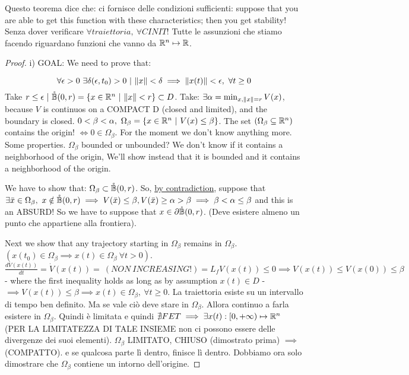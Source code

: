 Questo teorema dice che: ci fornisce delle condizioni sufficienti: suppose that you are able to get this function with these characteristics; then you get stability! Senza dover verificare $\forall traiettoria,\ \forall CINIT$! Tutte le assunzioni che stiamo facendo riguardano funzioni che vanno da $\mathbb{R}^n \mapsto \mathbb{R}$.

\begin{proof}{i)} \newline
GOAL: We need to prove that:

\[
	\forall \epsilon > 0\ \exists \delta(\epsilon,t_0) > 0\ |\ \lVert x\rVert < \delta \implies \lVert x(t)\rVert < \epsilon,\ \forall t \geq 0
\]
	Take $r \leq \epsilon\ |\ \oball(0,r) = \{x \in \R^n\ |\ \norma{x} < r\} \subset D$. Take:
$\exists \alpha = \min_{x,\lVert x\rVert=r}{V(x)}$, because $V$ is continuos on a COMPACT D (closed and limited), and the boundary is closed. $0 < \beta < \alpha,\ \Omega_\beta=\{x \in \R^n\ |\ V(x) \leq \beta\}$. The set $(\Omega_\beta \subseteq \mathbb{R}^n)$ contains the origin! $\iff 0 \in \Omega_\beta$.
For the moment we don't know anything more. Some properties. $\Omega_\beta$ bounded or unbounded? We don't know if it contains a neighborhood of the origin, We'll show instead that it is bounded and it contains a neighborhood of the origin.

We have to show that: $\Omega_\beta \subset \mathring{\mathbb{B}}(0,r)$. So, \underline{by contradiction}, suppose that $\exists \bar{x} \in \Omega_\beta,\ x \notin \mathring{\mathbb{B}}(0,r) \implies V(\bar{x}) \leq \beta, V(\bar{x}) \geq \alpha > \beta \implies \beta < \alpha \leq \beta$ and this is an ABSURD! So we have to suppose that $x \in \partial\mathring{\mathbb{B}}(0,r)$. (Deve esistere almeno un punto che appartiene alla frontiera).

Next we show that any trajectory starting in $\Omega_\beta$ remains in $\Omega_\beta$. $(x(t_0) \in \Omega_\beta \implies x(t) \in \Omega_\beta\ \forall t > 0)$. 
$\frac{dV(x(t))}{dt} = \dot{V}(x(t)) =\ (NON\ INCREASING!) = L_fV(x(t)) \leq 0 \implies V(x(t)) \leq V(x(0)) \leq \beta$ - where the first inequality holds as long as by assumption $x(t) \in D$ - $\implies V(x(t)) \leq \beta \implies x(t) \in \Omega_\beta,\ \forall t \geq 0$.
La traiettoria esiste su un intervallo di tempo ben definito. Ma se vale ciò deve stare in $\Omega_\beta$. Allora continuo a farla esistere in $\Omega_\beta$. Quindi è limitata e quindi $\nexists FET \implies \exists x(t):[0,+\infty) \mapsto \mathbb{R}^n$ (PER LA LIMITATEZZA DI TALE INSIEME non ci possono essere delle divergenze dei suoi elementi). 
$\Omega_\beta$ LIMITATO, CHIUSO (dimostrato prima) $\implies$ (COMPATTO). e se qualcosa parte lì dentro, finisce lì dentro. Dobbiamo ora solo dimostrare che $\Omega_\beta$ contiene un intorno dell'origine.


\end{proof}
